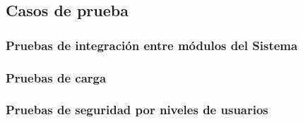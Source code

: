 \subsection{Casos de prueba}

\subsubsection{Pruebas de integración entre módulos del Sistema}

\subsubsection{Pruebas de carga}

\subsubsection{Pruebas de seguridad por niveles de usuarios}


